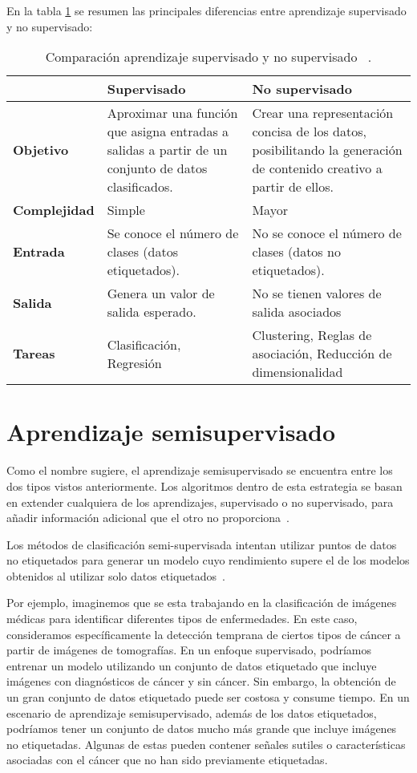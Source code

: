 En la tabla \ref{supervisado_VS_noSupervisado} se resumen las principales diferencias entre aprendizaje supervisado y no supervisado:
\begin{table}[ht]
	\centering
	\begin{tabular}{@{}p{2.5cm} p{5cm} p{5cm}@{}}
		\toprule
			 & \textbf{Supervisado} & \textbf{No supervisado} \\
		\midrule
		\textbf{Objetivo} & Aproximar una función que asigna entradas a salidas a partir de un conjunto de datos clasificados. & Crear una representación concisa de los datos, posibilitando la generación de contenido creativo a partir de ellos. \\
		\addlinespace[0.5em]
		\textbf{Complejidad} & Simple & Mayor\\
		\addlinespace[0.5em]
		\textbf{Entrada} & Se conoce el número de clases (datos etiquetados). & No se conoce el número de clases (datos no etiquetados). \\
		\addlinespace[0.5em]
		\textbf{Salida} & Genera un valor de salida esperado. & No se tienen valores de salida asociados \\
		\addlinespace[0.5em]
		\textbf{Tareas} & Clasificación, Regresión & Clustering, Reglas de asociación, Reducción de dimensionalidad \\
		\bottomrule
	\end{tabular}
	\caption{Comparación aprendizaje supervisado y no supervisado ~\cite{USL:guide}.}
	\label{supervisado_VS_noSupervisado}
\end{table}
\newpage


\section{Aprendizaje semisupervisado}
Como el nombre sugiere, el aprendizaje semisupervisado se encuentra entre los dos tipos vistos anteriormente. Los algoritmos dentro de esta estrategia se basan en extender cualquiera de los aprendizajes, supervisado o no supervisado, para añadir información adicional que el otro no proporciona~\cite{Intro:SemiSupervised}.

Los métodos de clasificación semi-supervisada intentan utilizar puntos de datos no etiquetados para generar un modelo cuyo rendimiento supere el de los modelos obtenidos al utilizar solo datos etiquetados~\cite{Engelen:semi-supervised}. 

Por ejemplo, imaginemos que se esta trabajando en la clasificación de imágenes médicas para identificar diferentes tipos de enfermedades. En este caso, consideramos específicamente la detección temprana de ciertos tipos de cáncer a partir de imágenes de tomografías. En un enfoque supervisado, podríamos entrenar un modelo utilizando un conjunto de datos etiquetado que incluye imágenes con diagnósticos de cáncer y sin cáncer. Sin embargo, la obtención de un gran conjunto de datos etiquetado puede ser costosa y consume tiempo. En un escenario de aprendizaje semisupervisado, además de los datos etiquetados, podríamos tener un conjunto de datos mucho más grande que incluye imágenes no etiquetadas. Algunas de estas pueden contener señales sutiles o características asociadas con el cáncer que no han sido previamente etiquetadas.

